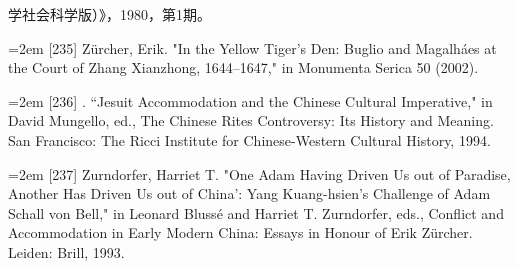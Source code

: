 学社会科学版）》，1980，第1期。%
\par
\noindent\hangindent=2em
[235] Zürcher, Erik. "In the Yellow Tiger's Den: Buglio and Magalháes at the Court of%
\space%
Zhang Xianzhong, 1644–1647," in Monumenta Serica 50 (2002).%
\par
\noindent\hangindent=2em
[236] . “Jesuit Accommodation and the Chinese Cultural Imperative," in David%
\space%
Mungello, ed., The Chinese Rites Controversy: Its History and Meaning. San%
\space%
Francisco: The Ricci Institute for Chinese-Western Cultural History, 1994.%
\par
\noindent\hangindent=2em
[237] Zurndorfer, Harriet T. "One Adam Having Driven Us out of Paradise, Another%
\space%
Has Driven Us out of China': Yang Kuang-hsien's Challenge of Adam Schall%
\space%
von Bell," in Leonard Blussé and Harriet T. Zurndorfer, eds., Conflict and%
\space%
Accommodation in Early Modern China: Essays in Honour of Erik Zürcher. Leiden:%
\space%
Brill, 1993.%
